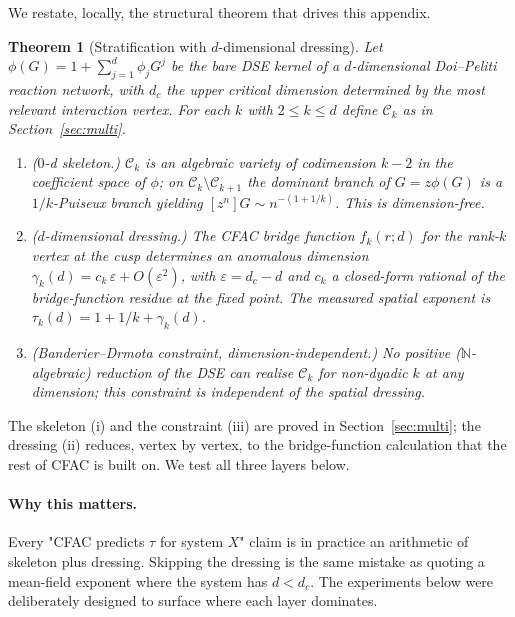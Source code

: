 \documentclass[11pt,a4paper]{article}
\theoremstyle{plain}
\newtheorem{theorem}{Theorem}
\theoremstyle{definition}
\begin{document}
We restate, locally, the structural theorem that drives this
appendix.

\begin{theorem}[Stratification with $d$-dimensional dressing]
\label{thm:strat}
Let $\phi(G) = 1 + \sum_{j=1}^{d}\phi_{j}G^{j}$ be the bare DSE
kernel of a $d$-dimensional Doi--Peliti reaction network, with
$d_{c}$ the upper critical dimension determined by the most
relevant interaction vertex.  For each $k$ with $2\leq k\leq d$
define $\mathcal{C}_{k}$ as in Section~\ref{sec:multi}.
\begin{enumerate}[label=(\roman*)]
\item ($0$-d skeleton.)  $\mathcal{C}_{k}$ is an algebraic
  variety of codimension $k-2$ in the coefficient space of
  $\phi$; on $\mathcal{C}_{k}\setminus\mathcal{C}_{k+1}$ the
  dominant branch of $G = z\phi(G)$ is a $1/k$-Puiseux branch
  yielding $[z^{n}]G \sim n^{-(1+1/k)}$.  This is dimension-free.
\item ($d$-dimensional dressing.)  The CFAC bridge function
  $f_{k}(r; d)$ for the rank-$k$ vertex at the cusp
  determines an anomalous dimension $\gamma_{k}(d) = c_{k}\,
  \varepsilon + O(\varepsilon^{2})$, with $\varepsilon =
  d_{c} - d$ and $c_{k}$ a closed-form rational of the
  bridge-function residue at the fixed point.  The measured
  spatial exponent is $\tau_{k}(d) = 1 + 1/k + \gamma_{k}(d)$.
\item (Banderier--Drmota constraint, dimension-independent.)
  No positive ($\mathbb{N}$-algebraic) reduction of the DSE can
  realise $\mathcal{C}_{k}$ for non-dyadic $k$ at any
  dimension; this constraint is independent of the spatial
  dressing.
\end{enumerate}
\end{theorem}

The skeleton (i) and the constraint (iii) are proved in
Section~\ref{sec:multi}; the dressing (ii) reduces, vertex by
vertex, to the bridge-function calculation that the rest of CFAC
is built on.  We test all three layers below.

\paragraph{Why this matters.}
Every "CFAC predicts $\tau$ for system $X$" claim is in
practice an arithmetic of skeleton plus dressing.  Skipping the
dressing is the same mistake as quoting a mean-field exponent
where the system has $d < d_{c}$.  The experiments below were
deliberately designed to surface where each layer dominates.
\end{document}

